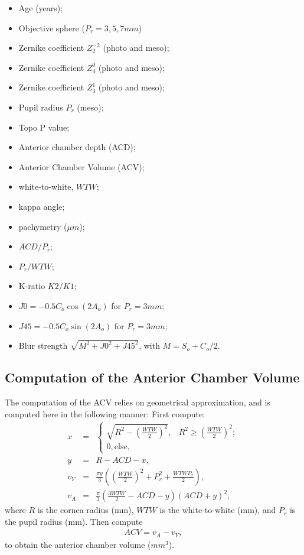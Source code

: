 \documentclass[article,twocolumn,preprint,10pt]{paper}%
\renewcommand{\(}{\left(}
\renewcommand{\)}{\right)}
\renewcommand{\[}{\left[}
\renewcommand{\]}{\right]}
\newcommand{\beqq}{\begin{eqnarray*}}
\newcommand{\eeqq}{\end{eqnarray*}}
\newcommand{\1}{\mbox{\boldmath$1$}}
\begin{document}
	\begin{itemize}
		\item Age (years); 
		\item Objective sphere ($P_r=3,5,7 mm$)
		\item Zernike coefficient $Z_2^{-2}$ (photo and meso);
		\item Zernike coefficient $Z_4^0$ (photo and meso);  
		\item Zernike coefficient $Z_3^1$ (photo and meso);
		\item Pupil radius $P_r$ (meso);
		\item Topo P value;
		\item Anterior chamber depth (ACD);
		\item Anterior Chamber Volume (ACV);
		\item white-to-white, $WTW$;
		\item kappa angle; 
		\item pachymetry ($\mu m$);
		\item $ACD/P_r$;
		\item  $P_r/WTW$;
		\item K-ratio $K2/K1$;
		\item $J0=-0.5C_o\cos(2A_o) $ for $P_r= 3mm$;
		\item $J45=-0.5C_o\sin(2A_o)$ for $P_r= 3mm$;
		\item Blur strength $\sqrt{M^2+J0^2 +J45^2}$, with $M= S_o+C_o/2$.
	\end{itemize}

    \subsection{Computation of the Anterior Chamber Volume}\label{subsection:ACV}
	The computation of the ACV relies on geometrical approximation, and is computed here in the following manner:
	First compute:
	\beqq 
	x      &=& \begin{cases}
		\sqrt{R^2 -\left(\frac{WTW}{2}\right)^2}, & R^2\geq \left(\frac{WTW}{2} \right)^2;\\
		0, \text{else},
	\end{cases}\\
	y      &=& R-ACD-x,\\
	v_Y &=& \frac{\pi y}{3}\left(\left(\frac{WTW}{2}\right)^2 + P_r^2 + \frac{WTWP_r}{2}\right),\\
	v_A &=&  \frac{\pi}{3}\left(\frac{3WTW}{2}- ACD-y\right)(ACD+y)^2,
	\eeqq
	where $R$ is the cornea radius (mm), $WTW$ is the white-to-white (mm), and $P_r$ is the pupil radius (mm).  
	Then compute 
	\beqq
	ACV = v_A-v_Y,
	\eeqq
	to obtain the anterior chamber volume ($mm^3$).

	
	
	
	
\end{document}
